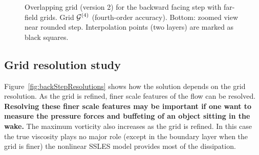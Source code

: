 {
\begin{figure}[hbt]
\newcommand{\figWidth}{16cm}
\newcommand{\trimfig}[2]{\trimFigb{#1}{#2}{0.01}{.01}{.275}{.275}}
\newcommand{\figWidtha}{5.5cm}
\newcommand{\trimfiga}[2]{\trimFigb{#1}{#2}{0.0}{.0}{.0}{.0}}
\begin{center}\small
\caption{
Overlapping grid (version 2) for the backward facing step with far-field grids. Grid ${\mathcal G}^{(4)}$ (fourth-order accuracy). Bottom: zoomed view near rounded step.
Interpolation points (two layers) are marked as black squares.
}
\label{fig:backStepRefineGrids}
\end{center}
\end{figure}
}

\clearpage
\subsection{Grid resolution study}

Figure~\ref{fig:backStepResolutions} shows how the solution depends on the grid resolution.
As the grid is refined, finer scale features of the flow can be resolved.
{\bf Resolving these finer scale features may be important if one want to measure the
pressure forces and buffeting of an object sitting in the wake.}
The maximum vorticity also increases as the grid is refined. 
In this case the true viscosity plays no major role (except in the boundary layer when the
grid is finer) the nonlinear SSLES model provides most of the dissipation.


